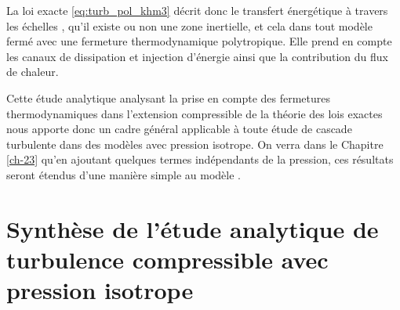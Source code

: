 La loi exacte  \eqref{eq:turb_pol_khm3} décrit donc le transfert énergétique à travers les échelles , qu'il existe ou non une zone inertielle, et cela dans tout modèle fermé avec une fermeture thermodynamique polytropique. Elle prend en compte les canaux de dissipation et injection d'énergie ainsi que la contribution du flux de chaleur. 

Cette étude analytique analysant la prise en compte des fermetures thermodynamiques dans l'extension compressible de la théorie des lois exactes nous apporte donc un cadre général applicable à toute étude de cascade turbulente dans des modèles  avec pression isotrope. On verra dans le Chapitre \ref{ch-23} qu'en ajoutant quelques termes indépendants de la pression, ces résultats seront étendus d'une manière simple au modèle .

\newpage
\section{Synthèse de l'étude analytique de turbulence compressible avec pression isotrope}
\label{synt-13}

